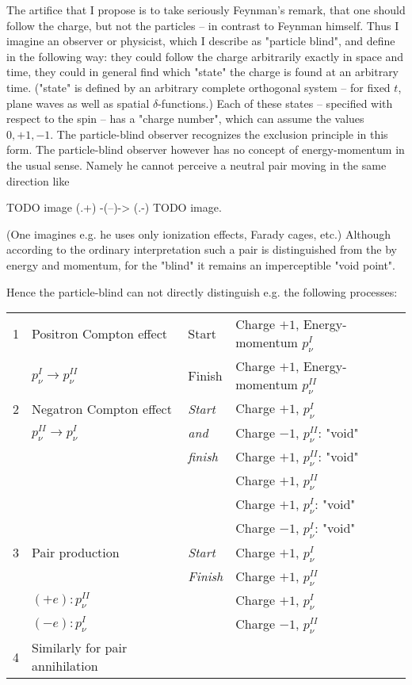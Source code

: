 \documentclass{article}
\begin{document}
The artifice that I propose is to take seriously Feynman's remark, that one should follow the charge, but not the particles -- in contrast to Feynman himself. Thus I imagine an observer or physicist, which I describe as "particle blind", and define in the following way: they could follow the charge arbitrarily exactly in space and time, they could in general find which "state" the charge is found at an arbitrary time. ("state" is defined by an arbitrary complete orthogonal system -- for fixed $t$,  plane waves as well as spatial $\delta$-functions.) Each of these states -- specified with respect to the spin -- has a "charge number", which can assume the values $0,+1,-1$. The particle-blind observer recognizes the exclusion principle in this form. The particle-blind observer however has no concept of energy-momentum in the usual sense. Namely he cannot perceive a neutral pair moving in the same direction like

TODO image 
 (.+)
-(--)->
 (.-)
TODO image.

(One imagines e.g. he uses only ionization effects, Farady cages, etc.) Although according to the ordinary interpretation such a pair is distinguished from the  by energy and momentum, for the "blind" it remains an imperceptible "void point".

Hence the particle-blind can not directly distinguish e.g. the following processes:

\begin{tabular}{llll}
1 & Positron Compton effect  & Start  & Charge $+1$, Energy-momentum $p_\nu^I$ \\
  & $p_\nu^I \to p_\nu^{II}$ & Finish & Charge $+1$, Energy-momentum $p_\nu^{II}$ \\
2 & Negatron Compton effect  & \textit{Start}    & Charge $+1$, $p_\nu^I$ \\
  & $p_\nu^{II} \to p_\nu^{I}$ & \textit{and}    & Charge $-1$, $p_\nu^{II}$: "void" \\
  &                            & \textit{finish} & Charge $+1$, $p_\nu^{II}$: "void" \\
  &                            &                 & Charge $+1$, $p_\nu^{II}$ \\
  &                            &                 & Charge $+1$, $p_\nu^{I}$: "void" \\
  &                            &                 & Charge $-1$, $p_\nu^{I}$: "void" \\
3 & Pair production            & \textit{Start}  & Charge $+1$, $p_\nu^{I}$\\
  &                            & \textit{Finish} & Charge $+1$, $p_\nu^{II}$\\
  & $(+e):p_\nu^{II}$          &                 & Charge $+1$, $p_\nu^{I}$\\
  & $(-e):p_\nu^{I}$           &                 & Charge $-1$, $p_\nu^{II}$\\
4 & Similarly for pair annihilation &            &
\end{tabular}
\end{document}
